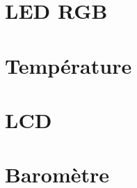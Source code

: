 \documentclass{report}
\begin{document}
		\section{LED RGB\label{code:rgb}}
			
			
		\section{Température\label{code:temp}}
			
			
		\section{LCD\label{code:lcd}}
			
			
		\section{Baromètre\label{code:bme}}
			
\end{document}
